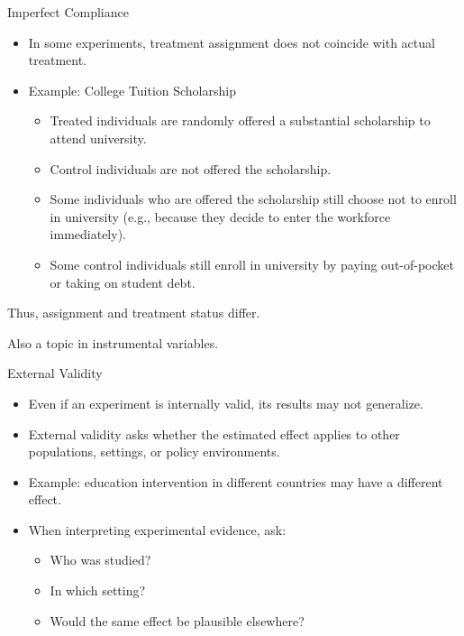 \documentclass[11pt,aspectratio=169]{beamer}
\begin{document}
\begin{frame}{Imperfect Compliance}
\begin{itemize}
  \item In some experiments, treatment assignment does not coincide with actual treatment.
  \item Example: College Tuition Scholarship
  \begin{itemize}
    \item Treated individuals are randomly offered a substantial scholarship to attend university.
    \item Control individuals are not offered the scholarship.
    \item Some individuals who are offered the scholarship still choose not to enroll in university (e.g., because they decide to enter the workforce immediately).
    \item Some control individuals still enroll in university by paying out-of-pocket or taking on student debt.
  \end{itemize}
\end{itemize}
  \item Thus, assignment and treatment status differ.
  \item Also a topic in instrumental variables.
\end{frame}
\begin{frame}{External Validity}
\begin{itemize}
  \item Even if an experiment is internally valid, its results may not generalize.
  \item External validity asks whether the estimated effect applies to other populations, settings, or policy environments.
  \item Example: education intervention in different countries may have a different effect.
  \item When interpreting experimental evidence, ask:
  \begin{itemize}
  \item Who was studied?
  \item In which setting?
  \item Would the same effect be plausible elsewhere?
\end{itemize}
\end{itemize}


\end{frame}
\end{document}
